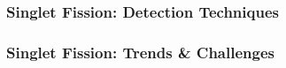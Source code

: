 \documentclass[compress]{beamer}
\begin{document}
\begin{frame}
  \frametitle{Singlet Fission: Detection Techniques}
%

\end{frame}


\begin{frame}
  \frametitle{Singlet Fission: Trends \& Challenges}
%
%

\end{frame}
\end{document}
